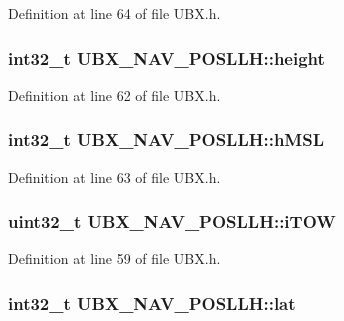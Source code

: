 \-Definition at line 64 of file \-U\-B\-X.\-h.

\hypertarget{struct_u_b_x___n_a_v___p_o_s_l_l_h_acb639227d81a2413277fb492f6b450a0}{
\subsubsection[{height}]{\setlength{\rightskip}{0pt plus 5cm}int32\-\_\-t {\bf \-U\-B\-X\-\_\-\-N\-A\-V\-\_\-\-P\-O\-S\-L\-L\-H\-::height}}}\label{struct_u_b_x___n_a_v___p_o_s_l_l_h_acb639227d81a2413277fb492f6b450a0}


\-Definition at line 62 of file \-U\-B\-X.\-h.

\hypertarget{struct_u_b_x___n_a_v___p_o_s_l_l_h_af78fd4a28f1595624f28d0df15bfcfac}{
\subsubsection[{h\-M\-S\-L}]{\setlength{\rightskip}{0pt plus 5cm}int32\-\_\-t {\bf \-U\-B\-X\-\_\-\-N\-A\-V\-\_\-\-P\-O\-S\-L\-L\-H\-::h\-M\-S\-L}}}\label{struct_u_b_x___n_a_v___p_o_s_l_l_h_af78fd4a28f1595624f28d0df15bfcfac}


\-Definition at line 63 of file \-U\-B\-X.\-h.

\hypertarget{struct_u_b_x___n_a_v___p_o_s_l_l_h_a85f34b0228c0157d478dfcefef43096f}{
\subsubsection[{i\-T\-O\-W}]{\setlength{\rightskip}{0pt plus 5cm}uint32\-\_\-t {\bf \-U\-B\-X\-\_\-\-N\-A\-V\-\_\-\-P\-O\-S\-L\-L\-H\-::i\-T\-O\-W}}}\label{struct_u_b_x___n_a_v___p_o_s_l_l_h_a85f34b0228c0157d478dfcefef43096f}


\-Definition at line 59 of file \-U\-B\-X.\-h.

\hypertarget{struct_u_b_x___n_a_v___p_o_s_l_l_h_a41a8c2e9da88805da15971d21c633f6f}{
\subsubsection[{lat}]{\setlength{\rightskip}{0pt plus 5cm}int32\-\_\-t {\bf \-U\-B\-X\-\_\-\-N\-A\-V\-\_\-\-P\-O\-S\-L\-L\-H\-::lat}}}\label{struct_u_b_x___n_a_v___p_o_s_l_l_h_a41a8c2e9da88805da15971d21c633f6f}


